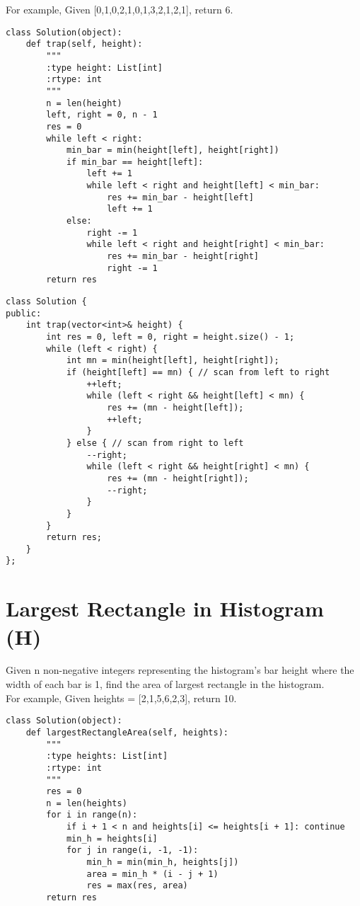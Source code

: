For example, Given [0,1,0,2,1,0,1,3,2,1,2,1], return 6. \\

\begin{lstlisting}
class Solution(object):
    def trap(self, height):
        """
        :type height: List[int]
        :rtype: int
        """
        n = len(height)
        left, right = 0, n - 1
        res = 0
        while left < right:
            min_bar = min(height[left], height[right])
            if min_bar == height[left]:
                left += 1
                while left < right and height[left] < min_bar:
                    res += min_bar - height[left]
                    left += 1
            else:
                right -= 1
                while left < right and height[right] < min_bar:
                    res += min_bar - height[right]
                    right -= 1
        return res
\end{lstlisting}

\begin{lstlisting}
class Solution {
public:
    int trap(vector<int>& height) {
        int res = 0, left = 0, right = height.size() - 1;
        while (left < right) {
            int mn = min(height[left], height[right]);
            if (height[left] == mn) { // scan from left to right
                ++left;
                while (left < right && height[left] < mn) {
                    res += (mn - height[left]);
                    ++left;
                }
            } else { // scan from right to left
                --right;
                while (left < right && height[right] < mn) {
                    res += (mn - height[right]);
                    --right;
                }
            }
        }
        return res;
    }
};
\end{lstlisting}


\section{Largest Rectangle in Histogram (H)}
Given n non-negative integers representing the histogram's bar height where the width of each bar is 1, find the area of largest rectangle in the histogram. \\

For example,
Given heights = [2,1,5,6,2,3],
return 10. \\

\begin{lstlisting}
class Solution(object):
    def largestRectangleArea(self, heights):
        """
        :type heights: List[int]
        :rtype: int
        """
        res = 0
        n = len(heights)
        for i in range(n):
            if i + 1 < n and heights[i] <= heights[i + 1]: continue
            min_h = heights[i]
            for j in range(i, -1, -1):
                min_h = min(min_h, heights[j])
                area = min_h * (i - j + 1)
                res = max(res, area)
        return res
\end{lstlisting}

